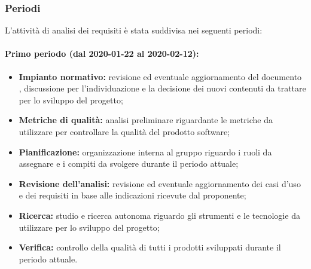 		\subsubsection{Periodi}
			L'attività di analisi dei requisiti è stata suddivisa nei seguenti periodi:
			\paragraph{Primo periodo (dal 2020-01-22 al 2020-02-12):}
				\begin{itemize}
				 	\item \textbf{Impianto normativo:} revisione ed eventuale aggiornamento del documento , discussione per l'individuazione e la decisione dei nuovi contenuti da trattare per lo sviluppo del progetto;
				 	\item \textbf{Metriche di qualità:} analisi preliminare riguardante le metriche da utilizzare per controllare la qualità del prodotto software;
				 	\item \textbf{Pianificazione:} organizzazione interna al gruppo riguardo i ruoli da assegnare e i compiti da svolgere durante il periodo attuale;
				 	\item \textbf{Revisione dell'analisi:} revisione ed eventuale aggiornamento dei casi d'uso e dei requisiti in base alle indicazioni ricevute dal proponente;
				 	\item \textbf{Ricerca:} studio e ricerca autonoma riguardo gli strumenti e le tecnologie da utilizzare per lo sviluppo del progetto;
				 	\item \textbf{Verifica:} controllo della qualità di tutti i prodotti sviluppati durante il periodo attuale.
				\end{itemize} 	
			

